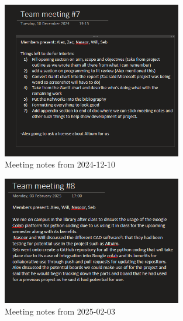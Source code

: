                     
                    \begin{figure}[htbp]
                        \centering
                        \includegraphics[width=0.7\textwidth]{figures/Appendix-MeetingNotes/meetingnote7.png}
                        \caption*{Meeting notes from 2024-12-10} 
                        \label{fig:meeting7}
                        \end{figure}

                        
                        \begin{figure}[htbp]
                            \centering
                            \includegraphics[width=0.7\textwidth]{figures/Appendix-MeetingNotes/meetingnote8.png}
                            \caption*{Meeting notes from 2025-02-03} 
                            \label{fig:meeting8}
                            \end{figure}

